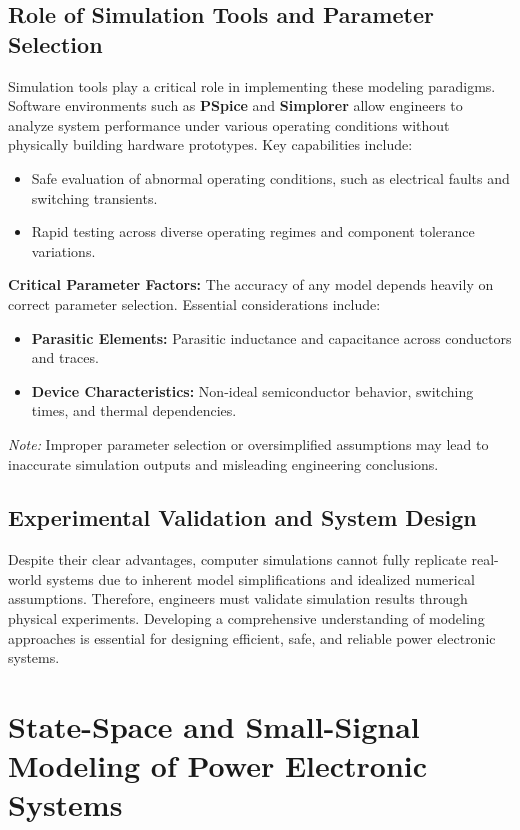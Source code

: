 \documentclass[12pt,a4paper]{article}
\begin{document}
\subsection{Role of Simulation Tools and Parameter Selection}
Simulation tools play a critical role in implementing these modeling paradigms. Software environments such as \textbf{PSpice} and \textbf{Simplorer} allow engineers to analyze system performance under various operating conditions without physically building hardware prototypes. Key capabilities include:
\begin{itemize}
    \item Safe evaluation of abnormal operating conditions, such as electrical faults and switching transients.
    \item Rapid testing across diverse operating regimes and component tolerance variations.
\end{itemize}

\textbf{Critical Parameter Factors:}
The accuracy of any model depends heavily on correct parameter selection. Essential considerations include:
\begin{itemize}
    \item \textbf{Parasitic Elements:} Parasitic inductance and capacitance across conductors and traces.
    \item \textbf{Device Characteristics:} Non-ideal semiconductor behavior, switching times, and thermal dependencies.
\end{itemize}
\emph{Note:} Improper parameter selection or oversimplified assumptions may lead to inaccurate simulation outputs and misleading engineering conclusions.

\subsection{Experimental Validation and System Design}
Despite their clear advantages, computer simulations cannot fully replicate real-world systems due to inherent model simplifications and idealized numerical assumptions. Therefore, engineers must validate simulation results through physical experiments. Developing a comprehensive understanding of modeling approaches is essential for designing efficient, safe, and reliable power electronic systems.

\section{State-Space and Small-Signal Modeling of Power Electronic Systems}
\end{document}
